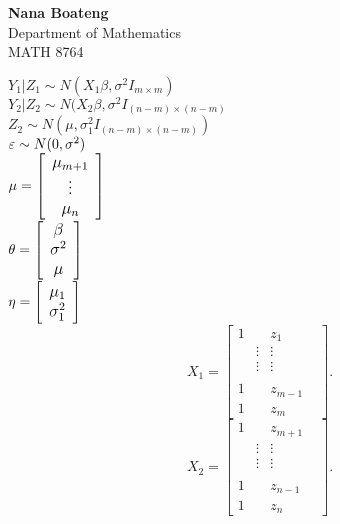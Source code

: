 \documentclass{article}\usepackage[]{graphicx}\usepackage[]{color}
\begin{document}

\begin{center}
{\Large {\bf Nana Boateng}} \\
\vspace{5mm}
{\Large Department of Mathematics} \\
\vspace{5mm}
{\Large MATH 8764} \\
\end{center}


$Y_{1}|Z_{1} \sim N(X_{1}\beta,\sigma^2 I_{m\times m})$\\
\vspace{5mm}
$Y_{2}|Z_{2} \sim N(X_{2}\beta,\sigma^2 I_{(n-m)\times (n-m)}$\\
\vspace{5mm}
$Z_{2} \sim N(\mu,\sigma^2_{1} I_{(n-m)\times (n-m)})$\\
\vspace{5mm}
$\large{\varepsilon} \sim N(0,\sigma^2)$\\
\vspace{5mm}
$\large{\mu}=\left[\begin{array}{c} \mu_{m+1} \\ \vdots \\ \mu_{n} \end{array} \right]$\\
\vspace{8mm}
$\large{\theta}=\left[\begin{array}{c} \beta \\ \sigma^{2} \\ \mu  \end{array} \right]$\\
\vspace{8mm}
$\large{\eta}=\left[\begin{array}{c} \mu_{1} \\ \sigma^{2}_{1}   \end{array} \right]$\\
\[X_{1} = \left[ \begin{array}{cccc}
1& & z_{1}\\

& \vdots & \vdots &  \\
& \vdots & \vdots &  \\
& & &  \\
 1&&z_{m-1} \\
 1 & & z_{m} \end{array} \right] .\]
 \[X_{2} = \left[ \begin{array}{cccc}
1& & z_{m+1}\\

& \vdots & \vdots &  \\
& \vdots & \vdots &  \\
& & &  \\
 1&&z_{n-1} \\
 1 & & z_{n} \end{array} \right] .\]
\end{document}
